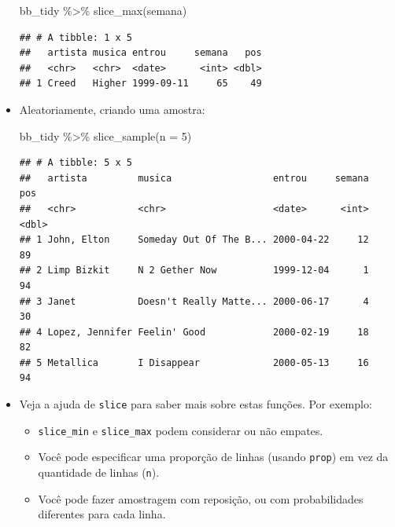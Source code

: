 \documentclass[
  11pt]{report}
\newenvironment{Shaded}{\begin{snugshade}}{\end{snugshade}}
\newcommand{\AttributeTok}[1]{\textcolor[rgb]{0.77,0.63,0.00}{#1}}
\newcommand{\DecValTok}[1]{\textcolor[rgb]{0.00,0.00,0.81}{#1}}
\newcommand{\FunctionTok}[1]{\textcolor[rgb]{0.00,0.00,0.00}{#1}}
\newcommand{\NormalTok}[1]{#1}
\newcommand{\SpecialCharTok}[1]{\textcolor[rgb]{0.00,0.00,0.00}{#1}}
\renewenvironment{Shaded}{
    \begin{mdframed}[%
      roundcorner=2pt,%
      innerleftmargin=5pt,%
      innerrightmargin=5pt,%
      topline=true,%
      leftline=true,%
      rightline=true,%
      bottomline=true,%
      linewidth=0.5pt,%
      linecolor=black!20,%
      backgroundcolor=black!2,%
      skipabove=2ex,%
      skipbelow=2.5ex%
    ]%
  }
  {
    \end{mdframed}
  }
\begin{document}
\begin{itemize}
\begin{Shaded}
\begin{Highlighting}[]
\NormalTok{bb\_tidy }\SpecialCharTok{\%\textgreater{}\%} 
  \FunctionTok{slice\_max}\NormalTok{(semana)}
\end{Highlighting}
\end{Shaded}

\begin{verbatim}
## # A tibble: 1 x 5
##   artista musica entrou     semana   pos
##   <chr>   <chr>  <date>      <int> <dbl>
## 1 Creed   Higher 1999-09-11     65    49
\end{verbatim}
\item
  Aleatoriamente, criando uma amostra:

\begin{Shaded}
\begin{Highlighting}[]
\NormalTok{bb\_tidy }\SpecialCharTok{\%\textgreater{}\%} 
  \FunctionTok{slice\_sample}\NormalTok{(}\AttributeTok{n =} \DecValTok{5}\NormalTok{)}
\end{Highlighting}
\end{Shaded}

\begin{verbatim}
## # A tibble: 5 x 5
##   artista         musica                  entrou     semana   pos
##   <chr>           <chr>                   <date>      <int> <dbl>
## 1 John, Elton     Someday Out Of The B... 2000-04-22     12    89
## 2 Limp Bizkit     N 2 Gether Now          1999-12-04      1    94
## 3 Janet           Doesn't Really Matte... 2000-06-17      4    30
## 4 Lopez, Jennifer Feelin' Good            2000-02-19     18    82
## 5 Metallica       I Disappear             2000-05-13     16    94
\end{verbatim}
\item
  Veja a ajuda de \texttt{slice} para saber mais sobre estas funções. Por exemplo:

  \begin{itemize}
  \item
    \texttt{slice\_min} e \texttt{slice\_max} podem considerar ou não empates.
  \item
    Você pode especificar uma proporção de linhas (usando \texttt{prop}) em vez da quantidade de linhas (\texttt{n}).
  \item
    Você pode fazer amostragem com reposição, ou com probabilidades diferentes para cada linha.
  \end{itemize}
\end{itemize}
\end{document}
